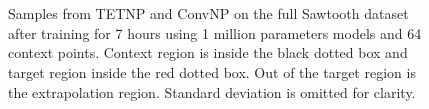 \documentclass[../../main.tex]{subfiles}
\begin{document}
\begin{figure}[H]
    \centering
    \\
    \\
    \caption{Samples from TETNP and ConvNP on the full Sawtooth dataset after training for 7 hours using 1 million parameters models and 64 context points. Context region is inside the black dotted box and target region inside the red dotted box. Out of the target region is the extrapolation region. Standard deviation is omitted for clarity.}
    \label{fig:full-saw-preds}
\end{figure}
\end{document}
